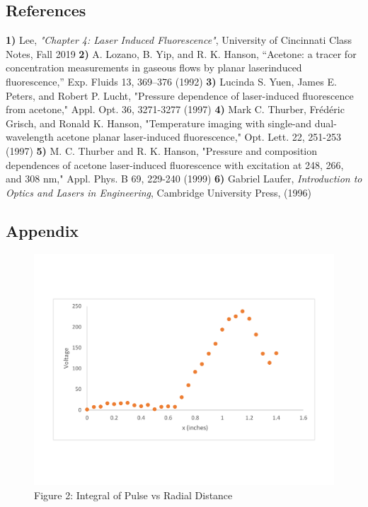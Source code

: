 \documentclass{article}
\begin{document}
\newpage
\begin{center}
    \subsection*{References}
\end{center}
$$$$
\newline
\textbf{1)} Lee, \textit{"Chapter 4: Laser Induced Fluorescence"}, University of Cincinnati Class Notes, Fall 2019 \newline
\textbf{2)}  A. Lozano, B. Yip, and R. K. Hanson, “Acetone: a tracer for concentration measurements in gaseous flows by planar laserinduced fluorescence,” Exp. Fluids 13, 369–376 (1992) \newline
\textbf{3)}  Lucinda S. Yuen, James E. Peters, and Robert P. Lucht, "Pressure dependence of laser-induced fluorescence from acetone," Appl. Opt. 36, 3271-3277 (1997)\newline
\textbf{4)}  Mark C. Thurber, Frédéric Grisch, and Ronald K. Hanson, "Temperature imaging with single-and dual-wavelength acetone planar laser-induced fluorescence," Opt. Lett. 22, 251-253 (1997) \newline
\textbf{5)} M. C. Thurber and R. K. Hanson, "Pressure and composition dependences of acetone laser-induced fluorescence with excitation at 248, 266, and 308 nm," Appl. Phys. B 69, 229-240 (1999) \newline
\textbf{6)} Gabriel Laufer, \textit{Introduction to Optics and Lasers in Engineering}, Cambridge University Press, (1996) \newline

\newpage
\begin{center}
    \section*{Appendix}
\end{center}

\begin{figure}[h]
    \centering
    \includegraphics[width=0.6\linewidth]{Lab2Intvsx.pdf}
    \caption*{{\footnotesize Figure 2: Integral of Pulse vs Radial Distance}}
\end{figure}
\end{document}
